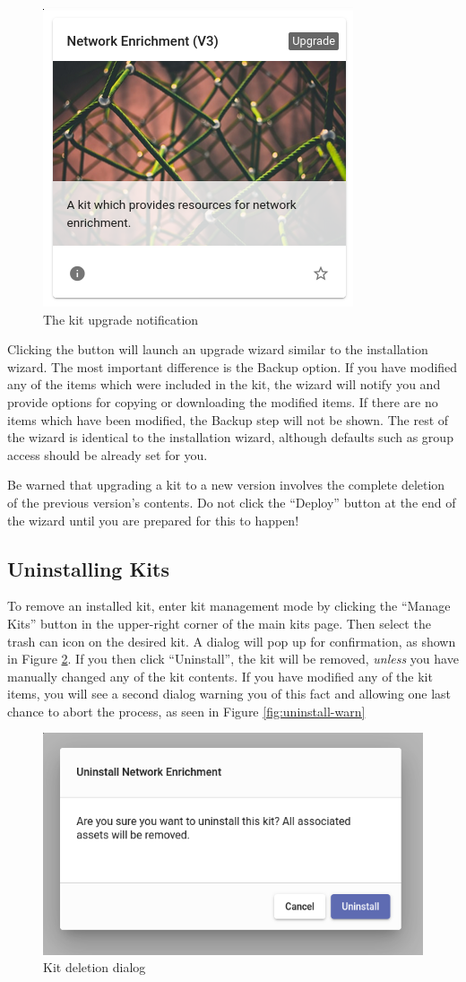 \begin{figure}[H]
	\includegraphics[width=0.4\linewidth]{images/upgradekit.png}
	\caption{The kit upgrade notification}
	\label{fig:upgradekit}
\end{figure}

Clicking the button will launch an upgrade wizard similar to the installation wizard. The most important difference is the Backup option. If you have modified any of the items which were included in the kit, the wizard will notify you and provide options for copying or downloading the modified items. If there are no items which have been modified, the Backup step will not be shown. The rest of the wizard is identical to the installation wizard, although defaults such as group access should be already set for you.

Be warned that upgrading a kit to a new version involves the complete deletion of the previous version's contents. Do not click the ``Deploy'' button at the end of the wizard until you are prepared for this to happen!

\subsection{Uninstalling Kits}

To remove an installed kit, enter kit management mode by clicking the ``Manage Kits'' button in the upper-right corner of the main kits page. Then select the trash can icon on the desired kit. A dialog will pop up for confirmation, as shown in Figure \ref{fig:uninstall-confirm}. If you then click ``Uninstall'', the kit will be removed, \emph{unless} you have manually changed any of the kit contents. If you have modified any of the kit items, you will see a second dialog warning you of this fact and allowing one last chance to abort the process, as seen in Figure \ref{fig:uninstall-warn}

\begin{figure}[H]
	\includegraphics[width=0.4\linewidth]{images/uninstall-confirm.png}
	\caption{Kit deletion dialog}
	\label{fig:uninstall-confirm}
\end{figure}

